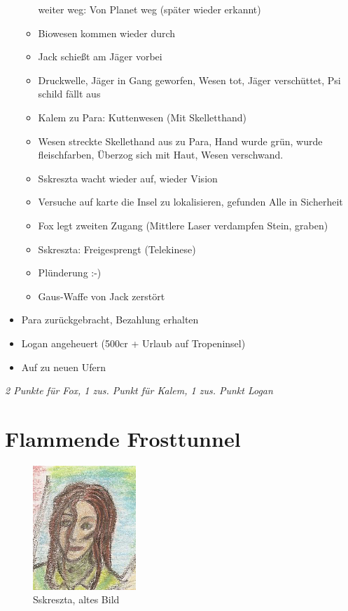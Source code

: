 \documentclass[11pt]{article}
\begin{document}
\begin{itemize}
\begin{itemize}
    weiter weg: Von Planet weg (später wieder erkannt)
  \item
    Biowesen kommen wieder durch
  \item
    Jack schießt am Jäger vorbei
  \item
    Druckwelle, Jäger in Gang geworfen, Wesen tot, Jäger verschüttet,
    Psi schild fällt aus
  \item
    Kalem zu Para: Kuttenwesen (Mit Skelletthand)
  \item
    Wesen streckte Skellethand aus zu Para, Hand wurde grün, wurde
    fleischfarben, Überzog sich mit Haut, Wesen verschwand.
  \item
    Sskreszta wacht wieder auf, wieder Vision
  \item
    Versuche auf karte die Insel zu lokalisieren, gefunden Alle in
    Sicherheit
  \item
    Fox legt zweiten Zugang (Mittlere Laser verdampfen Stein, graben)
  \item
    Sskreszta: Freigesprengt (Telekinese)
  \item
    Plünderung :-)
  \item
    Gaus-Waffe von Jack zerstört
  \end{itemize}
\item
  Para zurückgebracht, Bezahlung erhalten
\item
  Logan angeheuert (500cr + Urlaub auf Tropeninsel)
\item
  Auf zu neuen Ufern
\end{itemize}
\emph{2 Punkte für Fox, 1 zus. Punkt für Kalem, 1 zus. Punkt Logan}

\section{Flammende Frosttunnel}

\begin{figure}[htbp]
\centering
\includegraphics{sskreszta-portrait-alt-klein.png}
\caption{Sskreszta, altes Bild}
\end{figure}
\end{document}
